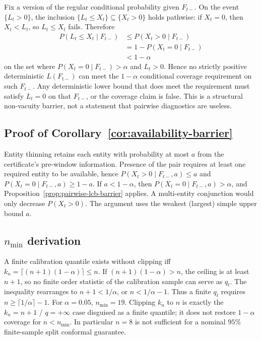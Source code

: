 Fix a version of the regular conditional probability given $F_{t-}$.  On the
event $\{L_t>0\}$, the inclusion $\{L_t\le X_t\}\subseteq\{X_t>0\}$ holds
pathwise: if $X_t=0$, then $X_t<L_t$, so $L_t\le X_t$ fails.  Therefore
\begin{align*}
P(L_t\le X_t\mid F_{t-})
&\le
P(X_t>0\mid F_{t-}) \\
&=
1-P(X_t=0\mid F_{t-}) \\
&<
1-\alpha
\end{align*}
on the set where $P(X_t=0\mid F_{t-})>\alpha$ and $L_t>0$.  Hence no strictly
positive deterministic $L(F_{t-})$ can meet the $1-\alpha$ conditional coverage
requirement on such $F_{t-}$.  Any deterministic lower bound that does meet
the requirement must satisfy $L_t=0$ on that $F_{t-}$, or the coverage claim
is false.  This is a structural non-vacuity barrier, not a statement that
pairwise diagnostics are useless.

\subsection{Proof of Corollary~\ref{cor:availability-barrier}}
\label{app:proof_availability_barrier}

Entity thinning retains each entity with probability at most $a$ from the
certificate's pre-window information.  Presence of the pair requires at least
one required entity to be available, hence $P(X_t>0\mid F_{t-},a)\le a$ and
$P(X_t=0\mid F_{t-},a)\ge 1-a$.  If $a<1-\alpha$, then
$P(X_t=0\mid F_{t-},a)>\alpha$, and Proposition~\ref{prop:pairwise-lcb-barrier}
applies.  A multi-entity conjunction would only decrease $P(X_t>0)$.  The
argument uses the weakest (largest) simple upper bound $a$.

\subsection{$n_{\min}$ derivation}
\label{app:nmin}

A finite calibration quantile exists without clipping iff
$k_n=\lceil(n+1)(1-\alpha)\rceil\le n$.  If $(n+1)(1-\alpha)>n$, the ceiling is
at least $n+1$, so no finite order statistic of the calibration sample can
serve as $q_t$.  The inequality rearranges to $n+1<1/\alpha$, or
$n<1/\alpha-1$.  Thus a finite $q_t$ requires
$n\ge\lceil 1/\alpha\rceil-1$.  For $\alpha=0.05$, $n_{\min}=19$.  Clipping
$k_n$ to $n$ is exactly the $k_n=n+1$ / $q=+\infty$ case disguised as a finite
quantile; it does not restore $1-\alpha$ coverage for $n<n_{\min}$.  In
particular $n=8$ is not sufficient for a nominal $95\%$ finite-sample split
conformal guarantee.

